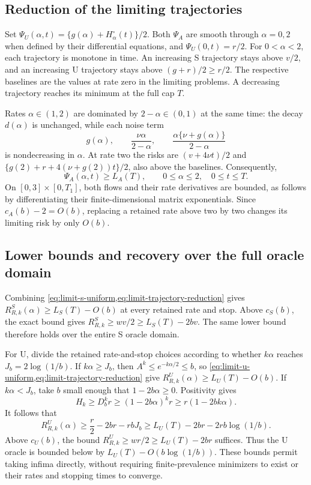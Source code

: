 \documentclass{alt2027}
\begin{document}
\subsection{Reduction of the limiting trajectories}

Set $\Psi_U(\alpha,t) = \{g(\alpha) + H^\circ_\alpha(t)\}/2$. Both $\Psi_A$ are
smooth through $\alpha = 0,2$ when defined by their differential equations, and
$\Psi_U(0,t) = r/2$. For $0 < \alpha < 2$, each trajectory is monotone in time.
An increasing S trajectory stays above $v/2$, and an increasing U trajectory
stays above $(g + r)/2 \geq r/2$. The respective baselines are the values at
rate zero in the limiting problems. A decreasing trajectory reaches its minimum
at the full cap $T$.

Rates $\alpha \in (1,2)$ are dominated by $2 - \alpha \in (0,1)$ at the same
time: the decay $d(\alpha)$ is unchanged, while each noise term
\[
  g(\alpha),\qquad \frac{\nu\alpha}{2 - \alpha},\qquad \frac{\alpha\{\nu + g(\alpha)\}}{2 - \alpha}
\]
is nondecreasing in $\alpha$. At rate two the risks are $(v + 4\nu t)/2$ and
$\{g(2) + r + 4(\nu + g(2))t\}/2$, also above the baselines. Consequently,
\begin{equation}
  \Psi_A(\alpha,t) \geq L_A(T), \qquad 0
                   \leq \alpha
                   \leq 2,\quad 0
                   \leq t
                   \leq T. \label{eq:limit-trajectory-reduction}
\end{equation}
On $[0,3] \times[0,T_1]$, both flows and their rate derivatives are bounded, as
follows by differentiating their finite-dimensional matrix exponentials. Since
$c_A(b) - 2 = O(b)$, replacing a retained rate above two by two changes its
limiting risk by only $O(b)$.

\subsection{Lower bounds and recovery over the full oracle domain}

Combining \cref{eq:limit-s-uniform,eq:limit-trajectory-reduction} gives
$R^S_{R,k}(\alpha) \geq L_S(T) - O(b)$ at every retained rate and stop. Above
$c_S(b)$, the exact bound gives $R^S_{R,k} \geq wv/2 \geq L_S(T) - 2bv$. The
same lower bound therefore holds over the entire S oracle domain.

For U, divide the retained rate-and-stop choices according to whether $k\alpha$
reaches $J_b = 2\log(1/b)$. If $k\alpha \geq J_b$, then
$A^k \leq e^{-k\alpha/2} \leq b$, so
\cref{eq:limit-u-uniform,eq:limit-trajectory-reduction} give
$R^U_{R,k}(\alpha) \geq L_U(T) - O(b)$. If $k\alpha < J_b$, take $b$ small
enough that $1 - 2b\alpha \geq 0$. Positivity gives
\[
  H_k \geq D_b^kr \geq (1 - 2b\alpha)^kr \geq r(1 - 2bk\alpha).
\]
It follows that
\[
  R^U_{R,k}(\alpha) \geq \frac r2 - 2br - rbJ_b
                    \geq L_U(T) - 2br - 2rb\log(1/b).
\]
Above $c_U(b)$, the bound $R^U_{R,k} \geq wr/2 \geq L_U(T) - 2br$ suffices. Thus
the U oracle is bounded below by $L_U(T) - O(b\log(1/b))$. These bounds permit
taking infima directly, without requiring finite-prevalence minimizers to exist
or their rates and stopping times to converge.
\end{document}
